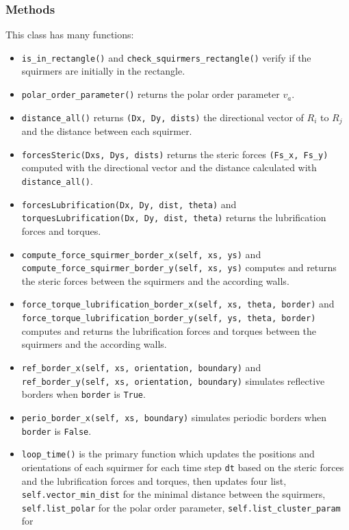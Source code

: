 \documentclass{article}
\begin{document}
\subsubsection*{Methods}
This class has many functions:
\begin{itemize}
   \item \texttt{is\_in\_rectangle()} and \texttt{check\_squirmers\_rectangle()} verify if the squirmers 
    are initially in the rectangle.
   \item \texttt{polar\_order\_parameter()} returns the polar order parameter $v_a$.
   \item \texttt{distance\_all()} returns \texttt{(Dx, Dy, dists)} the directional vector of $R_{i}$ to $R_{j}$ 
   and the distance between each squirmer.
   \item \texttt{forcesSteric(Dxs, Dys, dists)} returns the steric forces \texttt{(Fs\_x, Fs\_y)} computed with the directional vector and the distance calculated with \texttt{distance\_all()}.
   \item \texttt{forcesLubrification(Dx, Dy, dist, theta)} and \texttt{torquesLubrification(Dx, Dy, dist, theta)}
   returns the lubrification forces and torques.
   \item \texttt{compute\_force\_squirmer\_border\_x(self, xs, ys)} and \texttt{compute\_force\_squirmer\_border\_y(self, xs, ys)}
   computes and returns the steric forces between the squirmers and the according walls.
   \item \texttt{force\_torque\_lubrification\_border\_x(self, xs, theta, border)} and \texttt{force\_torque\_lubrification\_border\_y(self, ys, theta, border)}
   computes and returns the lubrification forces and torques between the squirmers and the according walls.
   \item \texttt{ref\_border\_x(self, xs, orientation, boundary)} and \texttt{ref\_border\_y(self, xs, orientation, boundary)} simulates reflective borders when \texttt{border} is \texttt{True}.
   \item \texttt{perio\_border\_x(self, xs, boundary)} simulates periodic borders when \texttt{border} is \texttt{False}.
   \item \texttt{loop\_time()} is the primary function which updates the positions and orientations of each squirmer
   for each time step \texttt{dt} based on the steric forces and the lubrification forces and torques, then updates four list, \texttt{self.vector\_min\_dist} for the minimal 
   distance between the squirmers, \texttt{self.list\_polar} for the polar order parameter, \texttt{self.list\_cluster\_param} for 

\end{itemize}
\end{document}
